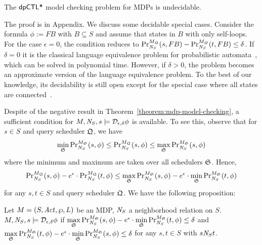 \begin{theorem}\label{theorem:mdp-model-checking}
The $\dpCTLstar$ model checking problem for MDPs  is undecidable.
\end{theorem}

The proof is in Appendix. We discuss some decidable special cases. Consider the formula $\phi:=F B$ with $B\subseteq S$ and assume that states in $B$ with only self-loops. For the case $\epsilon=0$, the condition reduces to
$\myPr{s}{M_{\scheduler{Q}}}{\neighbor{S}}{F B} -
\myPr{t}{M_{\scheduler{Q}}}{\neighbor{S}}{F B}\le \delta$. If $\delta=0$ it is the classical language equivalence problem for probabilistic automata~\cite{Rabin63}, which can be solved in polynomial time. However, if $\delta>0$, the problem
becomes an approximate version of the language equivalence problem. To
the best of our knowledge, its decidability is still open except for the special case where all states are connected~\cite{Tzeng92}.


Despite of the negative result in Theorem~\ref{theorem:mdp-model-checking},
a sufficient condition for $M, \neighbor{S}, s \models
\dpriv{\epsilon}{\delta} \phi$ is available.
To see this, observe that for $s \in S$ and
query scheduler $\scheduler{Q}$, we have
\[
  \min_{\scheduler{S}} \myPr{s}{M_{\scheduler{S}}}{\neighbor{S}}{\phi} 
  \leq
  \myPr{s}{M_{\scheduler{Q}}}{\neighbor{S}}{\phi} 
  \leq
  \max_{\scheduler{S}} \myPr{s}{M_{\scheduler{S}}}{\neighbor{S}}{\phi} 
\]
where the minimum and maximum are taken over all schedulers
$\scheduler{S}$. Hence, 
\begin{eqnarray*}
  \myPr{s}{M_{\scheduler{Q}}}{\neighbor{S}}{\phi} -
      e^\epsilon \cdot \myPr{t}{M_{\scheduler{Q}}}{\neighbor{S}}{\phi}
  \leq
    \max_{\scheduler{S}} \myPr{s}{M_{\scheduler{S}}}{\neighbor{S}}{\phi}
    - e^\epsilon \cdot
    \min_{\scheduler{S}} \myPr{t}{M_{\scheduler{S}}}{\neighbor{S}}{\phi}
\end{eqnarray*}
for any $s, t \in S$ and query scheduler $\scheduler{Q}$. We have the
following proposition:
\begin{proposition}\label{proposition:sufficient-condition-mdp-model-checking}
  Let $M = (S, \Act, \wp, L)$ be an MDP, $\neighbor{S}$ a
  neighborhood relation on $S$.
  $M, \neighbor{S}, s \models \dpriv{\epsilon}{\delta} \phi$ if
  $\max\limits_{\scheduler{S}} \myPr{s}{M_{\scheduler{S}}}{\neighbor{S}}{\phi}
    - e^\epsilon \cdot
    \min\limits_{\scheduler{S}} \myPr{t}{M_{\scheduler{S}}}{\neighbor{S}}{\phi}
    \leq \delta$ and
  $\max\limits_{\scheduler{S}} \myPr{t}{M_{\scheduler{S}}}{\neighbor{S}}{\phi}
    - e^\epsilon \cdot
    \min\limits_{\scheduler{S}} \myPr{s}{M_{\scheduler{S}}}{\neighbor{S}}{\phi}
    \leq \delta$ for any $s, t \in S$ with $s \neighbor{S} t$.
\end{proposition}

